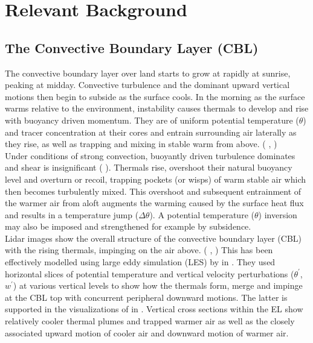 \section{Relevant Background}
\label{sec:}
\subsection{The Convective Boundary Layer (CBL)}

The convective boundary layer over land starts to grow at rapidly at sunrise, peaking at midday.  Convective turbulence and the dominant upward vertical motions then begin to subside as the surface cools. In the morning as the surface warms relative to the environment, instability causes thermals to develop and rise with buoyancy driven momentum. They are of uniform potential temperature ($\theta$) and tracer 
concentration at their cores and entrain surrounding air laterally as they rise, as well as trapping and mixing in stable warm from above. 
(\citeauthor{Stull-BLMetIntro} \cite{Stull-BLMetIntro}, \citeauthor{CrumStullEl} \cite{CrumStullEl})\\

Under conditions of strong convection, 
buoyantly driven turbulence dominates and shear is insignificant (\citeauthor{DirLEddy} \cite{DirLEddy}). Thermals rise, overshoot their
natural buoyancy level and overturn or recoil, trapping pockets (or wisps) of warm stable air which then becomes turbulently mixed.  This
overshoot and subsequent entrainment of the warmer air from aloft augments the warming caused by the surface heat flux and results in a
temperature jump ($\Delta \theta$).  A potential temperature ($\theta$) inversion may also be imposed and strengthened for example by subsidence.\\  

Lidar images show the overall structure of the convective boundary layer (\acs{CBL}) with the rising thermals, impinging on the air above.
(\citeauthor{CrumStullEl} \cite{CrumStullEl}, \citeauthor{Traum11} \cite{Traum11}) This has been effectively modelled using large eddy simulation (\acs{LES})
by \citeauthor{SchmidtSchu} in \cite{SchmidtSchu}.  They used horizontal slices of potential temperature and vertical velocity perturbations
($\theta^{'}$, $w^{'}$) at various vertical levels to show how the thermals form, merge and impinge at the \acs{CBL} top with concurrent peripheral downward motions.  The latter is supported in the visualizations of \citeauthor{SullMoengStev} in \cite{SullMoengStev}.  Vertical cross sections within the \acs{EL} show relatively cooler thermal plumes and trapped warmer air as well as the closely associated upward motion of cooler air and downward motion of warmer air.\\ 

